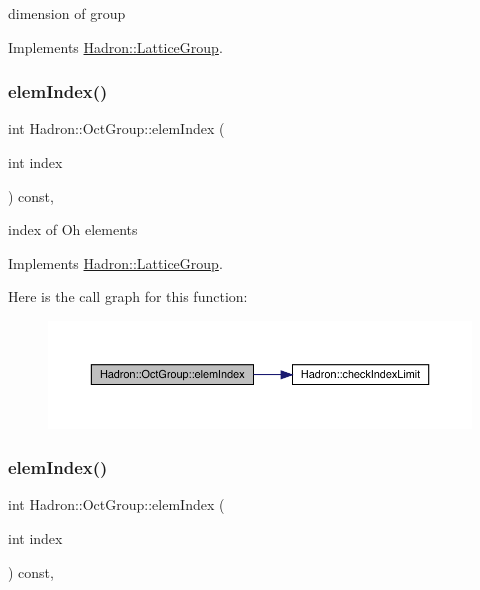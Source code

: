 dimension of group 

Implements \mbox{\hyperlink{structHadron_1_1LatticeGroup_abd8415698323796ef6a8605796ee3bea}{Hadron\+::\+Lattice\+Group}}.

\mbox{\label{structHadron_1_1OctGroup_a1410a74894e1d12337548245c4e6fd47}} 
\subsubsection{\texorpdfstring{elemIndex()}{elemIndex()}\hspace{0.1cm}{\footnotesize\ttfamily [1/2]}}
{\footnotesize\ttfamily int Hadron\+::\+Oct\+Group\+::elem\+Index (\begin{DoxyParamCaption}\item[{int}]{index }\end{DoxyParamCaption}) const\hspace{0.3cm}{\ttfamily [inline]}, {\ttfamily [virtual]}}

index of Oh elements 

Implements \mbox{\hyperlink{structHadron_1_1LatticeGroup_afb8e3ee60de059f75bce1044c694e1e8}{Hadron\+::\+Lattice\+Group}}.

Here is the call graph for this function\+:
\nopagebreak
\begin{figure}[H]
\begin{center}
\leavevmode
\includegraphics[width=350pt]{d1/de5/structHadron_1_1OctGroup_a1410a74894e1d12337548245c4e6fd47_cgraph}
\end{center}
\end{figure}
\mbox{\label{structHadron_1_1OctGroup_a1410a74894e1d12337548245c4e6fd47}} 
\subsubsection{\texorpdfstring{elemIndex()}{elemIndex()}\hspace{0.1cm}{\footnotesize\ttfamily [2/2]}}
{\footnotesize\ttfamily int Hadron\+::\+Oct\+Group\+::elem\+Index (\begin{DoxyParamCaption}\item[{int}]{index }\end{DoxyParamCaption}) const\hspace{0.3cm}{\ttfamily [inline]}, {\ttfamily [virtual]}}

